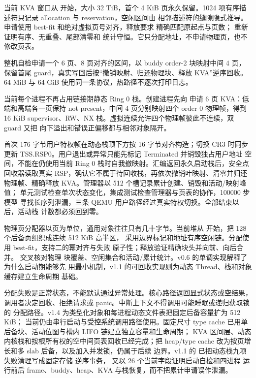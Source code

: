 当前 KVA 窗口从  开始，大小 32 TiB，首个 4 KiB
页永久保留。1024 项有序描述符只记录 allocation 与 reservation，空闲区间由
相邻描述符的缝隙隐式推导。申请使用 best-fit 和绝对虚拟页号对齐，释放要求
精确匹配原起点与页数； 重新证明有序、无重叠、尾部清零和
统计守恒。它只分配地址，不申请物理页，也不修改页表。

整机自检申请一个 6 页、8 页对齐的区间，以 buddy order-2 块映射中间 4 页，
保留首尾 guard，真实写回后按“撤销映射、归还物理块、释放 KVA”逆序回收。
64 MiB 与 64 GiB 使用同一条协议，热路径不逐次打印日志。

当前每个进程不再占用链接期静态 Ring 0 栈。创建进程先向
 申请 6 页 KVA：低端和高端各一页保持
not-present，中间 4 页分别映射四个 order-0 物理帧，得到 16 KiB
supervisor、RW、NX 栈。虚拟连续允许四个物理帧彼此不连续，双 guard 又把
向下溢出和错误正偏移都与相邻对象隔开。

首次 176 字节用户特权帧在动态栈顶下方按 16 字节对齐构造；切换 CR3 时同步
更新 TSS.RSP0。用户退出或异常只能先标记 Terminated 并销毁独占用户地址
空间，不能在仍使用当前 Ring 0 栈时自我撤映射。汇编返回永久启动栈后，安全点
回收器读取真实 RSP，确认它不属于待回收栈，再依次撤销叶映射、清零并归还
物理帧、精确释放 KVA。管理器以 512 个槽记录累计创建、销毁和活动/映射峰值；
单元测试检查单次状态变化，集成测试检查管理器与页表的协作，100000 步模型
寻找长序列泄漏，三条 QEMU 用户路径经过真实特权切换。全部结束以后，活动栈
计数都必须回到零。

物理页分配器以页为单位，通用对象往往只有几十字节。当前堆从
 开始，把 128 个后备页组织成连续 512 KiB 高半区，
采用边界标记和地址有序空闲链。分配使用 best-fit，支持二的幂对齐与失败
原子性；释放验证精确块头并向前、向后合并。 交叉核对物理
块覆盖、空闲集合和活动/累计统计。v0.6 的单调实现解释了为什么启动期能够先
用最小机制，v1.1 的可回收实现则为动态 Thread、栈和对象缓存建立生命周期
基础。

分配失败是正常状态，不能默认通过异常处理。核心路径返回显式状态或空结果，
调用者决定回收、拒绝请求或 panic。中断上下文不得调用可能睡眠或递归获取锁的
分配路径。v1.4 为类型化对象和每进程动态文件表把固定后备容量扩为 512 KiB；
当前仍由串行启动与受控系统调用路径使用。固定尺寸
type cache 已用单后备块、活动位图与槽内 LIFO 链建立独立容量和生命周期；
KVA 区间层、动态内核栈和按根所有权的空中间页表回收已经完成；把
heap/type cache 改为按页增长和多 slab 后备，以及加入并发锁，仍属于后续
边界。v1.1 的  已把动态栈九项失败清理写成固定存储
逆序事务， 又以 26 个当前字段证明启动自检和四进程
运行前后 frame、buddy、heap、KVA 与栈恢复，而不把累计申请误作泄漏。
